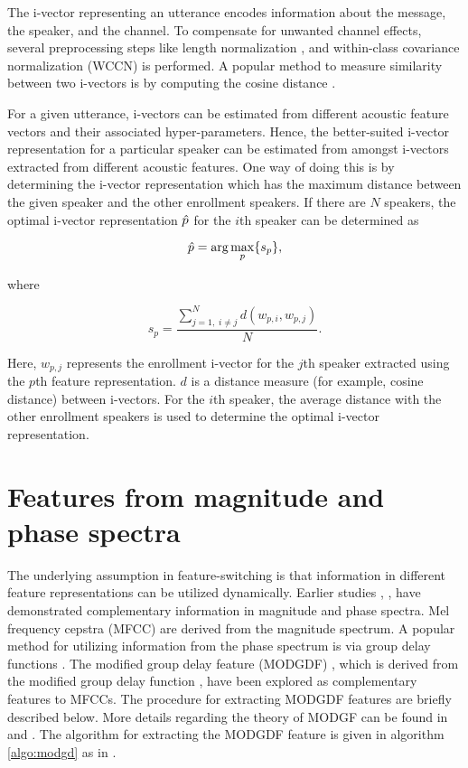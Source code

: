 \documentclass[preprint,12pt,5p]{elsarticle}
\begin{document}
The i-vector representing an utterance encodes information about the message,
the speaker, and the channel. To compensate for unwanted channel effects,
several preprocessing steps like length normalization \cite{garcia_lengthNorm},
and within-class covariance normalization (WCCN) \cite{wccn} is performed. A
popular method to measure similarity between two i-vectors is by computing the
cosine distance \cite{dehak_ivector}.

For a given utterance, i-vectors can be estimated from different acoustic
feature vectors and their associated hyper-parameters. Hence, the
better-suited i-vector representation for a particular speaker can be estimated
from amongst i-vectors extracted from different acoustic features. One way of
doing this is by determining the i-vector representation which has the maximum
distance between the given speaker and the other enrollment speakers. If there
are $N$ speakers, the optimal i-vector representation $\Hat{p}$ 
for the $i$th speaker can be determined as

\begin{equation}
\Hat{p} = \arg\max_p \{s_p\},
\label{eq:opt_ivec}
\end{equation}

where 

\begin{equation}
s_p = \frac{\displaystyle \sum_{j=1, \; i \neq j}^N d(w_{p,i},w_{p,j})}{N}.
\label{eq:sp}
\end{equation}

Here, $w_{p,j}$ represents the enrollment i-vector for the $j$th speaker
extracted using the $p$th feature representation. $d$ is a distance measure (for
example, cosine distance) between i-vectors. For the $i$th speaker, the average
distance with the other enrollment speakers is used to determine the optimal
i-vector representation. 

\section{Features from magnitude and phase spectra}
\label{sec:featExt}

The underlying assumption in feature-switching is that information in different
feature representations can be utilized dynamically. Earlier studies
\cite{complement1}, \cite{complement2}, \cite{complement2} have demonstrated
complementary information in magnitude and phase spectra. Mel frequency cepstra
(MFCC) are derived from the magnitude spectrum. A popular method for utilizing
information from the phase spectrum is via group delay functions
\cite{group_delay}. The modified group delay feature (MODGDF) \cite{modgd_feat},
which is derived from the modified group delay function \cite{modgd_func}, have
been explored as complementary features to MFCCs. The procedure for extracting
MODGDF features are briefly described below. More details regarding the theory
of MODGF can be found in \cite{modgd_func} and \cite{modgd_feat}. The algorithm
for extracting the MODGDF feature is given in algorithm \ref{algo:modgd} as 
in \cite{hegdeModgdf}.
\end{document}
